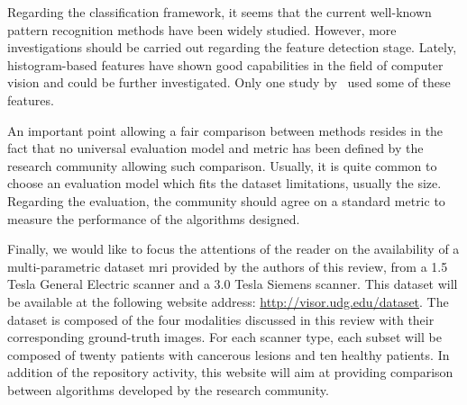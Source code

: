 Regarding the classification framework, it seems that the current well-known pattern recognition methods have been widely studied. However, more investigations should be carried out regarding the feature detection stage. Lately, histogram-based features have shown good capabilities in the field of computer vision and could be further investigated. Only one study by~\cite{Liu2013} used some of these features.

An important point allowing a fair comparison between methods resides in the fact that no universal evaluation model and metric has been defined by the research community allowing such comparison. Usually, it is quite common to choose an evaluation model which fits the dataset limitations, usually the size. Regarding the evaluation, the community should agree on a standard metric to measure the performance of the algorithms designed.

Finally, we would like to focus the attentions of the reader on the availability of a multi-parametric dataset \ac{mri} provided by the authors of this review, from a 1.5 Tesla General Electric scanner and a 3.0 Tesla Siemens scanner. This dataset will be available at the following website address: \url{http://visor.udg.edu/dataset}. The dataset is composed of the four modalities discussed in this review with their corresponding ground-truth images. For each scanner type, each subset will be composed of twenty patients with cancerous lesions and ten healthy patients. In addition of the repository activity, this website will aim at providing comparison between algorithms developed by the research community.

